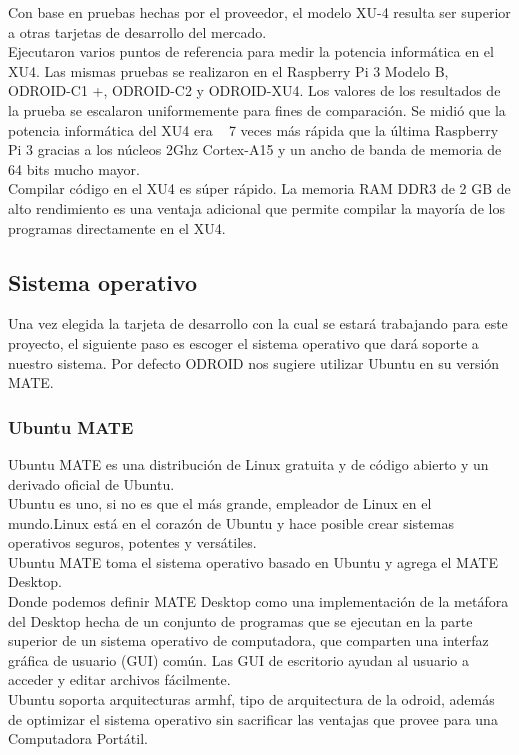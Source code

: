 Con base en pruebas hechas por el proveedor, el modelo XU-4 resulta ser superior
a otras tarjetas de desarrollo del mercado.\\
Ejecutaron varios puntos de referencia para medir la potencia informática en el XU4.
Las mismas pruebas se realizaron en el Raspberry Pi 3 Modelo B, ODROID-C1 +, ODROID-C2
y ODROID-XU4.
Los valores de los resultados de la prueba se escalaron uniformemente para fines de
comparación. Se midió que la potencia informática del XU4 era ~ 7 veces más rápida que
la última Raspberry Pi 3 gracias a los núcleos 2Ghz Cortex-A15 y un ancho de banda de
memoria de 64 bits mucho mayor.\\
Compilar código en el XU4 es súper rápido. La memoria RAM DDR3 de 2 GB de
alto rendimiento es una ventaja adicional que permite compilar la mayoría de los
programas directamente en el XU4.\cite{WEB:HK2020}


\subsection{Sistema operativo}
Una vez elegida la tarjeta de desarrollo con la cual se estará trabajando para este
proyecto, el siguiente paso es escoger el sistema operativo que dará soporte a nuestro
sistema. Por defecto ODROID nos sugiere utilizar Ubuntu en su versión MATE.
\subsubsection{Ubuntu MATE}
Ubuntu MATE es una distribución de Linux gratuita y de código abierto y un derivado
oficial de Ubuntu.\\
Ubuntu es uno, si no es que el más grande, empleador de Linux en el mundo.Linux está en el
corazón de Ubuntu y hace posible crear sistemas operativos seguros, potentes y versátiles.\\
Ubuntu MATE toma el sistema operativo basado en Ubuntu y agrega el MATE Desktop.\\
Donde podemos definir MATE Desktop como una implementación de la metáfora del Desktop
hecha de un conjunto de programas que se ejecutan en la parte superior de un sistema
operativo de computadora, que comparten una interfaz gráfica de usuario (GUI) común.
Las GUI de escritorio ayudan al usuario a acceder y editar archivos fácilmente.\cite{WEB:Ubuntu}\\
Ubuntu soporta arquitecturas armhf, tipo de arquitectura de la odroid, además de optimizar
el sistema operativo sin sacrificar las ventajas que provee para una Computadora Portátil.

